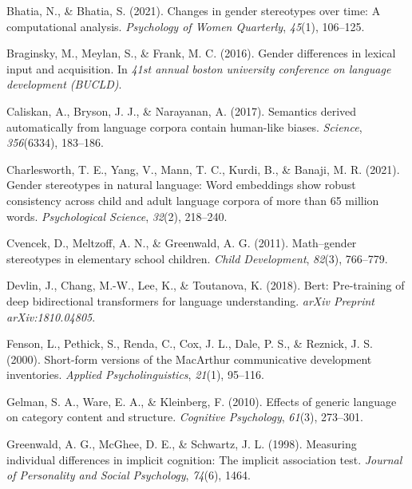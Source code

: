 \documentclass[10pt, letterpaper]{article}
\newenvironment{CSLReferences}%
  {}%
  {\par}
\begin{document}
\hypertarget{refs}{}
\begin{CSLReferences}{1}{0}
\leavevmode{}%
Bhatia, N., \& Bhatia, S. (2021). Changes in gender stereotypes over
time: A computational analysis. \emph{Psychology of Women Quarterly},
\emph{45}(1), 106--125.

\leavevmode{}%
Braginsky, M., Meylan, S., \& Frank, M. C. (2016). Gender differences in
lexical input and acquisition. In \emph{41st annual boston university
conference on language development (BUCLD)}.

\leavevmode{}%
Caliskan, A., Bryson, J. J., \& Narayanan, A. (2017). Semantics derived
automatically from language corpora contain human-like biases.
\emph{Science}, \emph{356}(6334), 183--186.

\leavevmode{}%
Charlesworth, T. E., Yang, V., Mann, T. C., Kurdi, B., \& Banaji, M. R.
(2021). Gender stereotypes in natural language: Word embeddings show
robust consistency across child and adult language corpora of more than
65 million words. \emph{Psychological Science}, \emph{32}(2), 218--240.

\leavevmode{}%
Cvencek, D., Meltzoff, A. N., \& Greenwald, A. G. (2011). Math--gender
stereotypes in elementary school children. \emph{Child Development},
\emph{82}(3), 766--779.

\leavevmode{}%
Devlin, J., Chang, M.-W., Lee, K., \& Toutanova, K. (2018). Bert:
Pre-training of deep bidirectional transformers for language
understanding. \emph{arXiv Preprint arXiv:1810.04805}.

\leavevmode{}%
Fenson, L., Pethick, S., Renda, C., Cox, J. L., Dale, P. S., \& Reznick,
J. S. (2000). Short-form versions of the MacArthur communicative
development inventories. \emph{Applied Psycholinguistics}, \emph{21}(1),
95--116.

\leavevmode{}%
Gelman, S. A., Ware, E. A., \& Kleinberg, F. (2010). Effects of generic
language on category content and structure. \emph{Cognitive Psychology},
\emph{61}(3), 273--301.

\leavevmode{}%
Greenwald, A. G., McGhee, D. E., \& Schwartz, J. L. (1998). Measuring
individual differences in implicit cognition: The implicit association
test. \emph{Journal of Personality and Social Psychology}, \emph{74}(6),
1464.


\end{CSLReferences}
\end{document}
